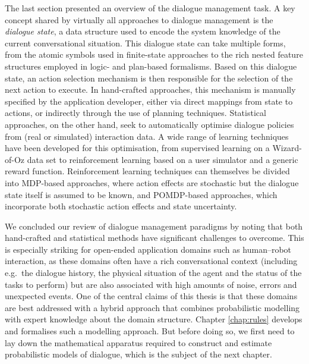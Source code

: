 The last section presented an overview of the dialogue management task. A key concept shared by virtually all approaches to dialogue management is the \textit{dialogue state}, a data structure used to encode the system knowledge of the current conversational situation.  This dialogue state can take multiple forms, from the atomic symbols used in finite-state approaches to the rich nested feature structures employed in logic- and plan-based formalisms. Based on this dialogue state, an action selection mechanism is then responsible for the selection of the next action to execute.  In hand-crafted approaches, this mechanism is manually specified by the application developer, either via direct mappings from state to actions, or indirectly through the use of planning techniques.  Statistical approaches, on the other hand, seek to automatically optimise dialogue policies from (real or simulated) interaction data.  A wide range of learning techniques have been developed for this optimisation, from supervised learning on a Wizard-of-Oz data set to reinforcement learning based on a user simulator and a generic reward function.   Reinforcement learning techniques can themselves be divided into MDP-based approaches, where action effects are stochastic but the dialogue state itself is assumed to be known, and POMDP-based approaches, which incorporate both stochastic action effects and state uncertainty.

We concluded our review of dialogue management paradigms by noting that both hand-crafted and statistical methods have significant challenges to overcome.  This is especially striking for open-ended application domains such as human--robot interaction, as these domains often have a rich conversational context (including e.g.\ the dialogue history, the physical situation of the agent and the status of the tasks to perform) but are also associated with high amounts of noise, errors and unexpected events. One of the central claims of this thesis is that these domains are best addressed with a hybrid approach that combines probabilistic modelling with expert knowledge about the domain structure.  Chapter \ref{chap:rules} develops and formalises such a modelling approach.  But before doing so, we first need to lay down the mathematical apparatus required to construct and estimate probabilistic models of dialogue, which is the subject of the next chapter.

